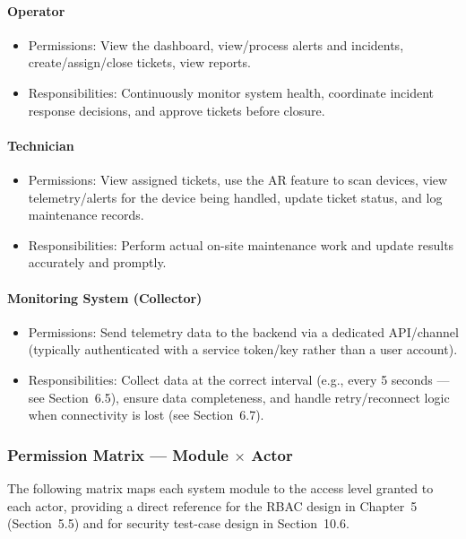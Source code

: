 \documentclass[12pt]{article}
\begin{document}
\paragraph{Operator}
\begin{itemize}[leftmargin=*]
    \item Permissions: View the dashboard, view/process alerts and incidents, create/assign/close tickets, view reports.
    \item Responsibilities: Continuously monitor system health, coordinate incident response decisions, and approve tickets before closure.
\end{itemize}

\paragraph{Technician}
\begin{itemize}[leftmargin=*]
    \item Permissions: View assigned tickets, use the AR feature to scan devices, view telemetry/alerts for the device being handled, update ticket status, and log maintenance records.
    \item Responsibilities: Perform actual on-site maintenance work and update results accurately and promptly.
\end{itemize}

\paragraph{Monitoring System (Collector)}
\begin{itemize}[leftmargin=*]
    \item Permissions: Send telemetry data to the backend via a dedicated API/channel (typically authenticated with a service token/key rather than a user account).
    \item Responsibilities: Collect data at the correct interval (e.g., every 5 seconds --- see Section~6.5), ensure data completeness, and handle retry/reconnect logic when connectivity is lost (see Section~6.7).
\end{itemize}

\subsubsection*{Permission Matrix --- Module $\times$ Actor}

The following matrix maps each system module to the access level granted to each actor, providing a direct reference for the RBAC design in Chapter~5 (Section~5.5) and for security test-case design in Section~10.6.
\end{document}
